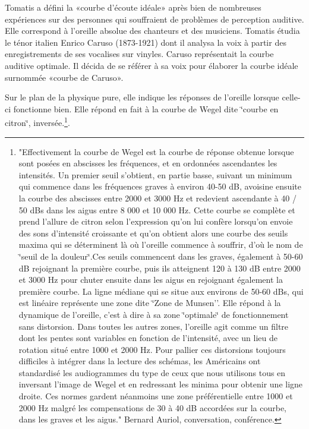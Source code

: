 Tomatis a défini la «courbe d\textquoteright écoute idéale» après
bien de nombreuses expériences sur des personnes qui souffraient de
problèmes de perception auditive. Elle correspond à l'oreille absolue
des chanteurs et des musiciens. Tomatis étudia le ténor italien Enrico
Caruso (1873-1921) dont il analysa la voix à partir des enregistrements
de ses vocalises sur vinyles. Caruso représentait la courbe auditive
optimale. Il décida de se référer à  sa voix pour élaborer la courbe idéale surnommée «courbe de Caruso».

Sur le plan de la physique pure, elle indique les réponses de l'oreille
lorsque celle-ci fonctionne bien. Elle répond en fait à la courbe
de Wegel dite \char`\"{}courbe en citron\char`\"{}, inversée.\footnote{
		"Effectivement la courbe de Wegel est la courbe de réponse obtenue
lorsque sont posées en abscisses les fréquences, et en ordonnées ascendantes
les intensités. Un premier seuil s'obtient, en partie basse, suivant
un minimum qui commence dans les fréquences graves à environ 40-50
dB, avoisine ensuite la courbe des abscisses entre 2000 et 3000 Hz
et redevient ascendante à 40 / 50 dBs dans les aigus entre 8 000 et
10 000 Hz. Cette courbe se complète et prend l'allure de citron selon
l'expression qu'on lui confère lorsqu\textquoteright on envoie des
sons d'intensité croissante et qu'on obtient alors une courbe des
seuils maxima qui se déterminent là où l'oreille commence à souffrir,
d'où le nom de \char`\"{}seuil de la douleur\char`\"{}.Ces seuils
commencent dans les graves, également à 50-60 dB rejoignant la première
courbe, puis ils atteignent 120 à 130 dB entre 2000 et 3000 Hz pour
chuter ensuite dans les aigus en rejoignant également la première
courbe. La ligne médiane qui se situe aux environs de 50-60 dBs, qui
est linéaire représente une zone dite \char`\"{}Zone de Munsen''.
Elle répond à la dynamique de l\textquoteright oreille, c\textquoteright est
à dire à sa zone \char`\"{}optimale\char`\"{} de fonctionnement sans
distorsion. Dans toutes les autres zones, l\textquoteright oreille
agit comme un filtre dont les pentes sont variables en fonction de
l\textquoteright intensité, avec un lieu de rotation situé entre 1000
et 2000 Hz. Pour pallier ces distorsions toujours difficiles à intégrer
dans la lecture des schémas, les Américains ont standardisé les audiogrammes
du type de ceux que nous utilisons tous en inversant l\textquoteright image
de Wegel et en redressant les minima pour obtenir une ligne droite.
Ces normes gardent néanmoins une zone préférentielle entre 1000 et
2000 Hz malgré les compensations de 30 à 40 dB accordées sur la courbe,
dans les graves et les aigus." Bernard Auriol, conversation, conférence.}.

